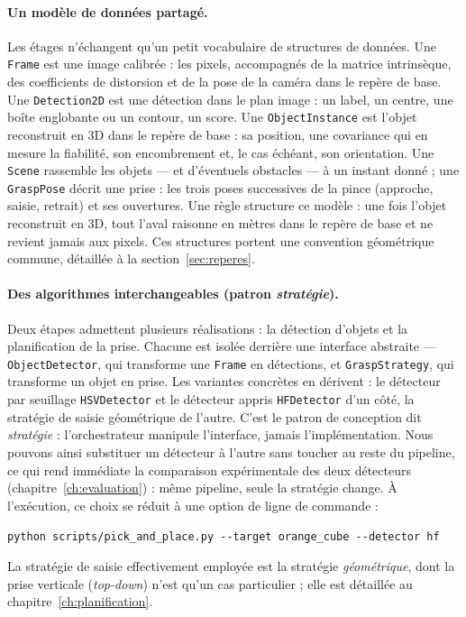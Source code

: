 \paragraph{Un modèle de données partagé.} Les étages n'échangent qu'un petit vocabulaire de structures de données. Une \texttt{Frame} est une image calibrée : les pixels, accompagnés de la matrice intrinsèque, des coefficients de distorsion et de la pose de la caméra dans le repère de base. Une \texttt{Detection2D} est une détection dans le plan image : un label, un centre, une boîte englobante ou un contour, un score. Une \texttt{ObjectInstance} est l'objet reconstruit en 3D dans le repère de base : sa position, une covariance qui en mesure la fiabilité, son encombrement et, le cas échéant, son orientation. Une \texttt{Scene} rassemble les objets --- et d'éventuels obstacles --- à un instant donné ; une \texttt{GraspPose} décrit une prise : les trois poses successives de la pince (approche, saisie, retrait) et ses ouvertures. Une règle structure ce modèle : une fois l'objet reconstruit en 3D, tout l'aval raisonne en mètres dans le repère de base et ne revient jamais aux pixels. Ces structures portent une convention géométrique commune, détaillée à la section~\ref{sec:reperes}.

\paragraph{Des algorithmes interchangeables (patron \emph{stratégie}).} Deux étapes admettent plusieurs réalisations : la détection d'objets et la planification de la prise. Chacune est isolée derrière une interface abstraite --- \texttt{ObjectDetector}, qui transforme une \texttt{Frame} en détections, et \texttt{GraspStrategy}, qui transforme un objet en prise. Les variantes concrètes en dérivent : le détecteur par seuillage \texttt{HSVDetector} et le détecteur appris \texttt{HFDetector} d'un côté, la stratégie de saisie géométrique de l'autre. C'est le patron de conception dit \emph{stratégie} : l'orchestrateur manipule l'interface, jamais l'implémentation. Nous pouvons ainsi substituer un détecteur à l'autre sans toucher au reste du pipeline, ce qui rend immédiate la comparaison expérimentale des deux détecteurs (chapitre~\ref{ch:evaluation}) : même pipeline, seule la stratégie change. À l'exécution, ce choix se réduit à une option de ligne de commande :
\begin{center}\verb|python scripts/pick_and_place.py --target orange_cube --detector hf|\end{center}
La stratégie de saisie effectivement employée est la stratégie \emph{géométrique}, dont la prise verticale (\emph{top-down}) n'est qu'un cas particulier ; elle est détaillée au chapitre~\ref{ch:planification}.

